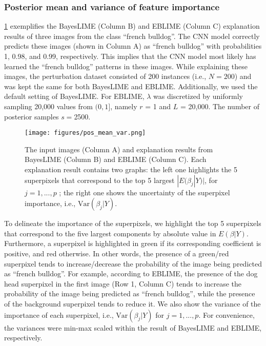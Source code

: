 \documentclass{article}
\theoremstyle{plain}
\theoremstyle{definition}
\theoremstyle{remark}
\begin{document}
\subsubsection{Posterior mean and variance of feature importance}
 \cref{pos_m_var} exemplifies the BayesLIME (Column B) and EBLIME (Column C) explanation results of three images from the class “french bulldog”. The CNN model correctly predicts these images (shown in Column A) as ``french bulldog'' with probabilities 1, 0.98, and 0.99, respectively. This implies that the CNN model most likely has learned the ``french bulldog'' patterns in these images. While explaining these images, the perturbation dataset consisted of 200 instances (i.e., $N=200$) and was kept the same for both BayesLIME and EBLIME. Additionally, we used the default setting of BayesLIME. For EBLIME, $\lambda$ was discretized by uniformly sampling 20,000 values from $(0,1]$, namely $r$ = 1 and $L$ = 20,000. The number of posterior samples $s=$2500. 

 \begin{figure}[hbt]
\begin{center}
\centerline{\texttt{[image: figures/pos\_mean\_var.png]}}
\caption{The input images (Column A) and explanation results from BayesLIME (Column B) and EBLIME (Column C). Each explanation result contains two graphs: the left one highlights the 5 superpixels that correspond to the top 5 largest $|E(\beta_j|Y)|$, for $j = 1,...,p$ ; the right one shows the uncertainty of the superpixel importance, i.e., $\textrm{Var}(\beta_j|Y)$.}
\label{pos_m_var}
\end{center}
\end{figure}

To delineate the importance of the superpixels, we highlight the top 5 superpixels that correspond to the five largest components by absolute value in $E(\beta|Y)$. Furthermore, a superpixel is highlighted in green if its corresponding coefficient is positive, and red otherwise. In other words, the presence of a green/red superpixel tends to increase/decrease the probability of the image being predicted as ``french bulldog''. For example, according to EBLIME, the presence of the dog head superpixel in the first image (Row 1, Column C) tends to increase the probability of the image being predicted as ``french bulldog'', while the presence of the background superpixel tends to reduce it. We also show the variance of the importance of each superpixel, i.e., $\textrm{Var}(\beta_j|Y)$ for $j = 1,...,p$. For convenience, the variances were min-max scaled within the result of BayesLIME and EBLIME, respectively. 
\end{document}
